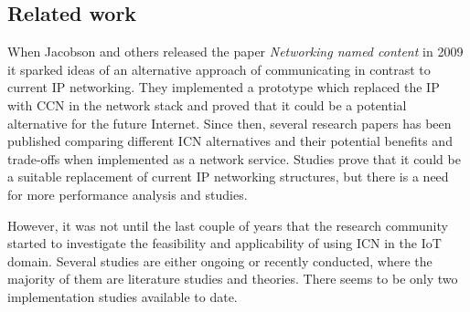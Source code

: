 \subsection{Related work}

When Jacobson and others released the paper \textit{Networking named content} in 2009 it sparked ideas of an alternative approach of communicating in contrast to current IP networking\cite{Jacobson2009}. They implemented a prototype which replaced the IP with CCN in the network stack and proved that it could be a potential alternative for the future Internet.
Since then, several research papers has been published comparing different ICN alternatives and their potential benefits and trade-offs when implemented as a network service\cite{Ahlgren2012}. Studies prove that it could be a suitable replacement of current IP networking structures, but there is a need for more performance analysis and studies\cite{Ahlgren2012}\cite{Greek-ICN-networking-survey-2014}.

However, it was not until the last couple of years that the research community started to investigate the feasibility and applicability of using ICN in the IoT domain. Several studies are either ongoing or recently conducted, where the majority of them are literature studies and theories. There seems to be only two implementation studies available to date.

